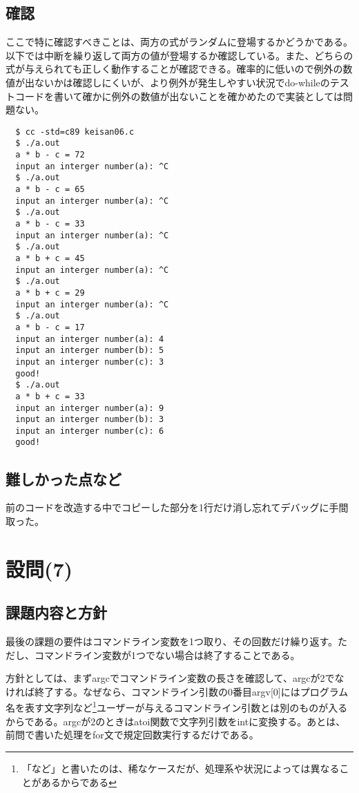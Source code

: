 \documentclass[dvipdfmx,12pt,a4j]{jarticle}
\begin{document}
\subsection{確認}
ここで特に確認すべきことは、両方の式がランダムに登場するかどうかである。以下では中断を繰り返して両方の値が登場するか確認している。また、どちらの式が与えられても正しく動作することが確認できる。確率的に低いので例外の数値が出ないかは確認しにくいが、より例外が発生しやすい状況でdo-whileのテストコードを書いて確かに例外の数値が出ないことを確かめたので実装としては問題ない。
\begin{verbatim}
  $ cc -std=c89 keisan06.c
  $ ./a.out
  a * b - c = 72
  input an interger number(a): ^C
  $ ./a.out
  a * b - c = 65
  input an interger number(a): ^C
  $ ./a.out
  a * b - c = 33
  input an interger number(a): ^C
  $ ./a.out
  a * b + c = 45
  input an interger number(a): ^C
  $ ./a.out
  a * b + c = 29
  input an interger number(a): ^C
  $ ./a.out
  a * b - c = 17
  input an interger number(a): 4
  input an interger number(b): 5
  input an interger number(c): 3
  good!
  $ ./a.out
  a * b + c = 33
  input an interger number(a): 9
  input an interger number(b): 3
  input an interger number(c): 6
  good!
\end{verbatim}

\subsection{難しかった点など}
前のコードを改造する中でコピーした部分を1行だけ消し忘れてデバッグに手間取った。

\section{設問(7)}
\subsection{課題内容と方針}
最後の課題の要件はコマンドライン変数を1つ取り、その回数だけ繰り返す。ただし、コマンドライン変数が1つでない場合は終了することである。

方針としては、まずargcでコマンドライン変数の長さを確認して、argcが2でなければ終了する。なぜなら、コマンドライン引数の0番目argv[0]にはプログラム名を表す文字列など\footnote{「など」と書いたのは、稀なケースだが、処理系や状況によっては異なることがあるからである}ユーザーが与えるコマンドライン引数とは別のものが入るからである。argcが2のときはatoi関数で文字列引数をintに変換する。あとは、前問で書いた処理をfor文で規定回数実行するだけである。
\end{document}
